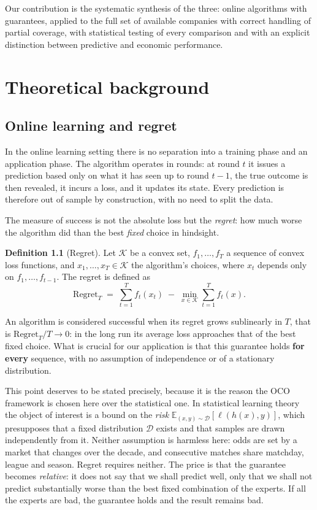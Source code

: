 \documentclass[12pt,a4paper,oneside]{report}
\renewcommand{\_}{\oldunderscore\allowbreak}
\theoremstyle{definition}
\newtheorem{definition}{Definition}[chapter]
\theoremstyle{plain}
\theoremstyle{remark}
\begin{document}
Our contribution is the systematic synthesis of the three: online algorithms with guarantees,
applied to the full set of available companies with correct handling of partial coverage, with
statistical testing of every comparison and with an explicit distinction between predictive
and economic performance.

\chapter{Theoretical background}
\label{ch:theory}

\section{Online learning and regret}

In the online learning setting there is no separation into a training phase and an application
phase. The algorithm operates in rounds: at round $t$ it issues a prediction based only on
what it has seen up to round $t-1$, the true outcome is then revealed, it incurs a loss, and
it updates its state. Every prediction is therefore out of sample by construction, with no
need to split the data.

The measure of success is not the absolute loss but the \emph{regret}: how much worse the
algorithm did than the best \emph{fixed} choice in hindsight.

\begin{definition}[Regret]
Let $\mathcal{K}$ be a convex set, $f_1,\dots,f_T$ a sequence of convex loss functions, and
$x_1,\dots,x_T \in \mathcal{K}$ the algorithm's choices, where $x_t$ depends only on
$f_1,\dots,f_{t-1}$. The regret is defined as
\[
\mathrm{Regret}_T \;=\; \sum_{t=1}^{T} f_t(x_t) \;-\; \min_{x \in \mathcal{K}} \sum_{t=1}^{T} f_t(x).
\]
\end{definition}

An algorithm is considered successful when its regret grows sublinearly in $T$, that is
$\mathrm{Regret}_T / T \to 0$: in the long run its average loss approaches that of the best
fixed choice. What is crucial for our application is that this guarantee holds \textbf{for
every} sequence, with no assumption of independence or of a stationary distribution.

This point deserves to be stated precisely, because it is the reason the OCO framework is
chosen here over the statistical one. In statistical learning theory the object of interest is
a bound on the \emph{risk} $\mathbb{E}_{(x,y)\sim\mathcal{D}}[\ell(h(x),y)]$, which presupposes
that a fixed distribution $\mathcal{D}$ exists and that samples are drawn independently from
it. Neither assumption is harmless here: odds are set by a market that changes over the
decade, and consecutive matches share matchday, league and season. Regret requires neither.
The price is that the guarantee becomes \emph{relative}: it does not say that we shall predict
well, only that we shall not predict substantially worse than the best fixed combination of
the experts. If all the experts are bad, the guarantee holds and the result remains bad.
\end{document}
